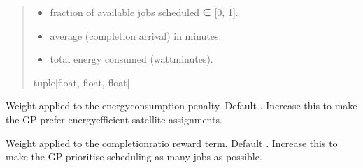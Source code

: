 \documentclass[letterpaper,10pt,english]{sphinxmanual}
\begin{document}
\begin{fulllineitems}
\begin{fulllineitems}
\begin{quote}
\begin{description}
\begin{itemize}
\end{itemize}

\sphinxAtStartPar

\sphinxAtStartPar
{}
\begin{itemize}
\item {} 
\sphinxAtStartPar
{}          \textendash{} fraction of available jobs scheduled ∈ {[}0, 1{]}.

\item {} 
\sphinxAtStartPar
{}  \textendash{} average (completion \sphinxhyphen{} arrival) in minutes.

\item {} 
\sphinxAtStartPar
{}        \textendash{} total energy consumed (watt\sphinxhyphen{}minutes).

\end{itemize}


\sphinxAtStartPar
tuple{[}float, float, float{]}

\end{description}\end{quote}

\end{fulllineitems}


\begin{fulllineitems}
\label{\detokenize{api:scheduler.FitnessEvaluator.weightEnergy}}
\pysigstartsignatures
\pysigline
{}
\pysigstopsignatures
\sphinxAtStartPar
Weight applied to the energy\sphinxhyphen{}consumption penalty.  Default .
Increase this to make the GP prefer energy\sphinxhyphen{}efficient satellite assignments.

\end{fulllineitems}


\begin{fulllineitems}
\label{\detokenize{api:scheduler.FitnessEvaluator.weightJobs}}
\pysigstartsignatures
\pysigline
{}
\pysigstopsignatures
\sphinxAtStartPar
Weight applied to the completion\sphinxhyphen{}ratio reward term.  Default .
Increase this to make the GP prioritise scheduling as many jobs as possible.


\end{fulllineitems}
\end{fulllineitems}
\end{document}
